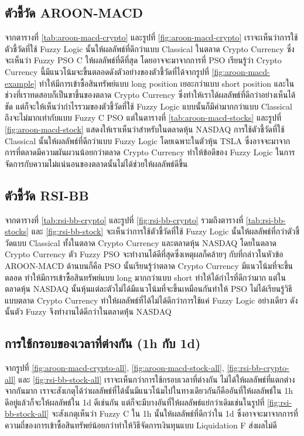 \subsection{ตัวชี้วัด AROON-MACD}
จากตารางที่ \ref{tab:aroon-macd-crypto} และรูปที่ \ref{fig:aroon-macd-crypto} เราจะเห็นว่าการใช้ตัวชี้วัดที่ใช้ Fuzzy Logic นั้นให้ผลลัพธ์ที่ดีกว่าแบบ Classical ในตลาด Crypto Currency ซึ่งจะเห็นว่า Fuzzy PSO C ให้ผลลัพธ์ที่ดีที่สุด โดยอาจจะมาจากการที่ PSO เรียนรู้ว่า Crypto Currency นี้มีแนวโน้มจะขึ้นตลอดดังตัวอย่างของตัวชี้วัดที่ได้จากรูปที่ \ref{fig:aroon-macd-example} ทำให้มีการเข้าซื้อสินทรัพย์แบบ long position เยอะกว่าแบบ short position และในช่วงที่เราทดสอบก็เป็นขาขึ้นของตลาด Crypto Currency ซึ่งทำให้เราได้ผลลัพธ์ที่ดีกว่าอย่างเห็นได้ชัด แต่ก็จะให้เห็นว่ากำไรรวมของตัวชี้วัดที่ใช้ Fuzzy Logic แบบนั้นก็มีค่ามากกว่าแบบ Classical ถึงจะไม่มากเท่ากับแบบ Fuzzy C PSO แต่ในตารางที่ \ref{tab:aroon-macd-stocks} และรูปที่ \ref{fig:aroon-macd-stock} แสดงให้เราเห็นว่าสำหรับในตลาดหุ้น NASDAQ การใช้ตัวชี้วัดที่ใช้ Classical นั้นให้ผลลัพธ์ที่ดีกว่าแบบ Fuzzy Logic โดยเฉพาะในตัวหุ้น TSLA ซึ่งอาจจะมาจากการที่ตลาดมีความผันผวนน้อยกว่าตลาด Crypto Currency ทำให้ข้อดีของ Fuzzy Logic ในการจัดการกับความไม่แน่นอนของตลาดนั้นไม่ได้ช่วยให้ผลลัพธ์ดีขึ้น

\subsection{ตัวชี้วัด RSI-BB}
จากตารางที่ \ref{tab:rsi-bb-crypto} และรูปที่ \ref{fig:rsi-bb-crypto} รวมถึงตารางที่ \ref{tab:rsi-bb-stocks} และ \ref{fig:rsi-bb-stock} จะเห็นว่าการใช้ตัวชี้วัดที่ใช้ Fuzzy Logic นั้นให้ผลลัพธ์ที่กว่าตัวชี้วัดแบบ Classical ทั้งในตลาด Crypto Currency และตลาดหุ้น NASDAQ โดยในตลาด Crypto Currency ตัว Fuzzy PSO จะทำงานได้ดีที่สุดซึ่งเหตุผลก็คล้ายๆ กับที่กล่าวในหัวข้อ AROON-MACD ด้านบนก็คือ PSO นั้นเรียนรู้ว่าตลาด Crypto Currency มีแนวโน้มที่จะขึ้นตลอด ทำให้มีการเข้าซื้อสินทรัพย์แบบ long มากกว่าแบบ short ทำให้ได้กำไรที่ดีกว่ามาก แต่ในตลาดหุ้น NASDAQ นั้นหุ้นแต่ละตัวไม่ได้มีแนวโน้มที่จะขึ้นเหมือนกันทำให้ PSO ไม่ได้เรียนรู้วิธีแบบตลาด Crypto Currency ทำให้ผลลัพธ์ที่ได้ไม่ได้ดีกว่าการใช้แค่ Fuzzy Logic อย่างเดียว ดังนั้นตัว Fuzzy จึงทำงานได้ดีกว่าในตลาดหุ่้น NASDAQ

\subsection{การใช้กรอบของเวลาที่ต่างกัน (1h กับ 1d)}
จากรูปที่ \ref{fig:aroon-macd-crypto-all}, \ref{fig:aroon-macd-stock-all}, \ref{fig:rsi-bb-crypto-all} และ \ref{fig:rsi-bb-stock-all} เราจะเห็นกว่าการใช้กรอบเวลาที่ต่างกัน ไม่ได้ให้ผลลัพธ์ที่แตกต่างจากกันมาก เราจะสังเกตุได้ว่าผลลัพธ์ที่ได้นั้นมีแนวโน้มไปในทางเดียวกันก็คืออันที่ให้ผลลัพธ์ใน 1h ดีอยู่แล้วก็จะให้ผลลัพธ์ใน 1d ดีเช่นกัน แต่ก็จะมีบางอันที่ให้ผลลัพธ์แย่กว่าเดิมเช่นในรูปที่ \ref{fig:rsi-bb-stock-all} จะสังเกตุเห็นว่า Fuzzy C ใน 1h นั้นให้ผลลัพธ์ที่ดีกว่าใน 1d ซึ่งอาจจะมาจากการที่ความถี่ของการเข้าซื้อสินทรัพย์น้อยกว่าทำให้วิธีจัดการเงินทุนแบบ Liquidation F ส่งผลไม่ดี

